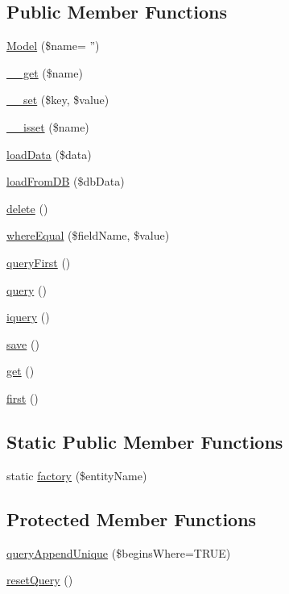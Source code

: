 \subsection*{Public Member Functions}
\begin{DoxyCompactItemize}
\item 
\hyperlink{class_model_a8cc7988e004a495b0d25cc6c01b6f884}{Model} (\$name= '')
\item 
\hyperlink{class_model_a740f266bff6a614abd25c11530bdda3d}{\-\_\-\-\_\-get} (\$name)
\item 
\hyperlink{class_model_a769d1b670dfa274cfa71d95fb5c88626}{\-\_\-\-\_\-set} (\$key, \$value)
\item 
\hyperlink{class_model_afd3c70662171bf6c4664626a245387fb}{\-\_\-\-\_\-isset} (\$name)
\item 
\hyperlink{class_model_a58b187d0c715b371c4f645c248f6c177}{load\-Data} (\$data)
\item 
\hyperlink{class_model_ac64cc79e4c13535290c5a9e541dd5c3b}{load\-From\-D\-B} (\$db\-Data)
\item 
\hyperlink{class_model_af55cc78d20b12b64bb6f584496a60a52}{delete} ()
\item 
\hyperlink{class_model_ab3a9338aed971438c000f48cc9437fb2}{where\-Equal} (\$field\-Name, \$value)
\item 
\hyperlink{class_model_a873f0557177461db7f2bc45fddd4e972}{query\-First} ()
\item 
\hyperlink{class_model_abca9540af2da0f51f169126653f9987f}{query} ()
\item 
\hyperlink{class_model_a4b48e51bac838c71942ae03534f9265a}{iquery} ()
\item 
\hyperlink{class_model_a02e884635e22adb8a876485b707a6b1c}{save} ()
\item 
\hyperlink{class_model_af100452b17d173fd3773cb2d5d4d3407}{get} ()
\item 
\hyperlink{class_model_ac4bda269fcd3b08d688f098dda30ed0c}{first} ()
\end{DoxyCompactItemize}
\subsection*{Static Public Member Functions}
\begin{DoxyCompactItemize}
\item 
static \hyperlink{class_model_a86eb89694ab8101e26907d3915a09d02}{factory} (\$entity\-Name)
\end{DoxyCompactItemize}
\subsection*{Protected Member Functions}
\begin{DoxyCompactItemize}
\item 
\hyperlink{class_model_a69d81ae658ad55c8cb383a08044a2bfe}{query\-Append\-Unique} (\$begins\-Where=T\-R\-U\-E)
\item 
\hyperlink{class_model_acbbdd15ee99f269cfb7f4914fee4cb51}{reset\-Query} ()
\end{DoxyCompactItemize}
